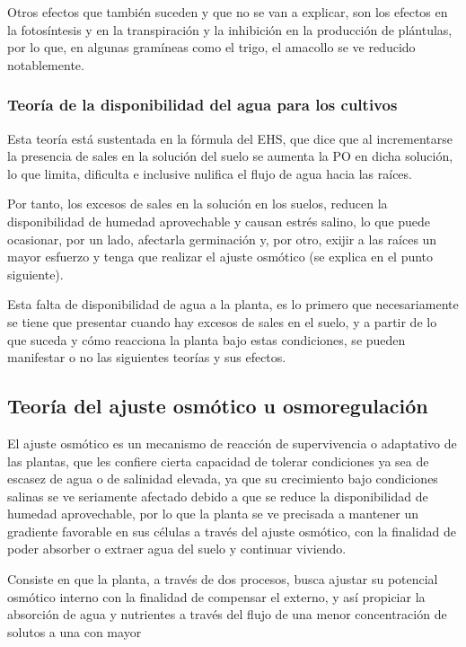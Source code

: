 Otros efectos que también suceden y que no se van a explicar, son los efectos en la fotosíntesis y en la transpiración y la inhibición en la producción de plántulas, por lo que, en algunas gramíneas como el trigo, el amacollo se ve reducido notablemente.

\subsubsection{Teoría de la disponibilidad del agua para los cultivos}
Esta teoría está sustentada en la fórmula del EHS, que dice que al incrementarse la presencia de sales en la solución del suelo se aumenta la PO en dicha solución, lo que limita, dificulta e inclusive nulifica el flujo de agua hacia las raíces.

Por tanto, los excesos de sales en la solución en los suelos, reducen la disponibilidad de humedad aprovechable y causan estrés salino, lo que puede ocasionar, por un lado, afectarla germinación y, por otro, exijir a las raíces un mayor esfuerzo y tenga que realizar el ajuste osmótico (se explica en el punto siguiente).

Esta falta de disponibilidad de agua a la planta, es lo primero que necesariamente se tiene que presentar cuando hay excesos de sales en el suelo, y a partir de lo que suceda y cómo reacciona la planta bajo estas condiciones, se pueden manifestar o no las siguientes teorías y sus efectos.
\subsection{Teoría del ajuste osmótico u osmoregulación}
El ajuste osmótico es un mecanismo de reacción de supervivencia o adaptativo de las plantas, que les confiere cierta capacidad de tolerar condiciones ya sea de escasez de agua o de salinidad elevada, ya que su crecimiento bajo condiciones salinas se ve seriamente afectado debido a que se reduce la disponibilidad de humedad aprovechable, por lo que la planta se ve precisada a mantener un gradiente favorable en sus células a través del ajuste osmótico, con la finalidad de poder absorber o extraer agua del suelo y continuar viviendo.

Consiste en que la planta, a través de dos procesos, busca ajustar su potencial osmótico interno con la finalidad de compensar el externo, y así propiciar la absorción de agua y nutrientes a través del flujo de una menor concentración de solutos a una con mayor

